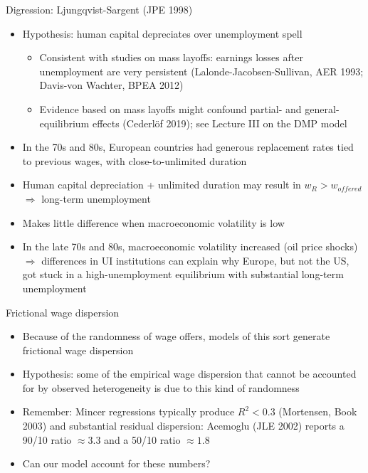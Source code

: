 \documentclass[9pt]{beamer}
\newcommand{\bit}{\begin{itemize}}
\newcommand{\eit}{\end{itemize}}
\newcommand{\bc}{\color{blue}}
\begin{document}
\begin{frame}{Digression: Ljungqvist-Sargent (JPE 1998)}

\bit
\setlength\itemsep{1.5em}
\item Hypothesis: human capital depreciates over unemployment spell
\bit
\setlength\itemsep{0.5em}
	\item Consistent with studies on mass layoffs: earnings losses after unemployment are very persistent (Lalonde-Jacobsen-Sullivan, AER 1993; Davis-von Wachter, BPEA 2012)

	\item Evidence based on mass layoffs might confound partial- and general-equilibrium effects (Cederl\"of 2019); see Lecture III on the DMP model
\eit

\item In the 70s and 80s, European countries had generous replacement rates tied to previous wages, with close-to-unlimited duration

\item Human capital depreciation + unlimited duration may result in $w_R>w_{offered}$ $\Rightarrow$ long-term unemployment

\item Makes little difference when macroeconomic volatility is low

\item In the late 70s and 80s, macroeconomic volatility increased (oil price shocks) $\Rightarrow$ differences in UI institutions can explain why Europe, but not the US, got stuck in a high-unemployment equilibrium with substantial long-term unemployment
\eit

\end{frame}


\begin{frame}{Frictional wage dispersion}

\bit
\setlength\itemsep{2em}

\item Because of the randomness of wage offers, models of this sort generate {\bc frictional wage dispersion}

\item Hypothesis: some of the empirical wage dispersion that cannot be accounted for by observed heterogeneity is due to this kind of randomness

\item Remember: Mincer regressions typically produce $R^2 < 0.3$ (Mortensen, Book 2003) and substantial residual dispersion: Acemoglu (JLE 2002) reports a 90/10 ratio $\approx 3.3$ and a 50/10 ratio $\approx 1.8$

\item Can our model account for these numbers?

\eit


\end{frame}
\end{document}

